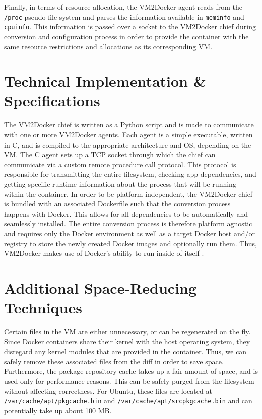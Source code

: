 Finally, in terms of resource allocation, the VM2Docker agent reads from the \texttt{/proc} pseudo file-system and parses the information available in \texttt{meminfo} and \texttt{cpuinfo}. This information is passed over a socket to the VM2Docker chief during conversion and configuration process in order to provide the container with the same resource restrictions and allocations as its corresponding VM.

\section{Technical Implementation \& Specifications}
The VM2Docker chief is written as a Python script and is made to communicate with one or more VM2Docker agents. Each agent is a simple executable, written in C, and is compiled to the appropriate architecture and OS, depending on the VM. The C agent sets up a TCP socket through which the chief can communicate via a custom remote procedure call protocol. This protocol is responsible for transmitting the entire filesystem, checking app dependencies, and getting specific runtime information about the process that will be running within the container. In order to be platform independent, the VM2Docker chief is bundled with an associated Dockerfile such that the conversion process happens with Docker. This allows for all dependencies to be automatically and seamlessly installed. The entire conversion process is therefore platform agnostic and requires only the Docker environment as well as a target Docker host and/or registry to store the newly created Docker images and optionally run them. Thus, VM2Docker makes use of Docker's ability to run inside of itself \cite{dockerindocker}.

\section{Additional Space-Reducing Techniques}
Certain files in the VM are either unnecessary, or can be regenerated on the fly. Since Docker containers share their kernel with the host operating system, they disregard any kernel modules that are provided in the container. Thus, we can safely remove these associated files from the diff in order to save space. Furthermore, the package repository cache takes up a fair amount of space, and is used only for performance reasons. This can be safely purged from the filesystem without affecting correctness. For Ubuntu, these files are located at \texttt{/var/cache/apt/pkgcache.bin} and \texttt{/var/cache/apt/srcpkgcache.bin} and can potentially take up about 100 MB.
